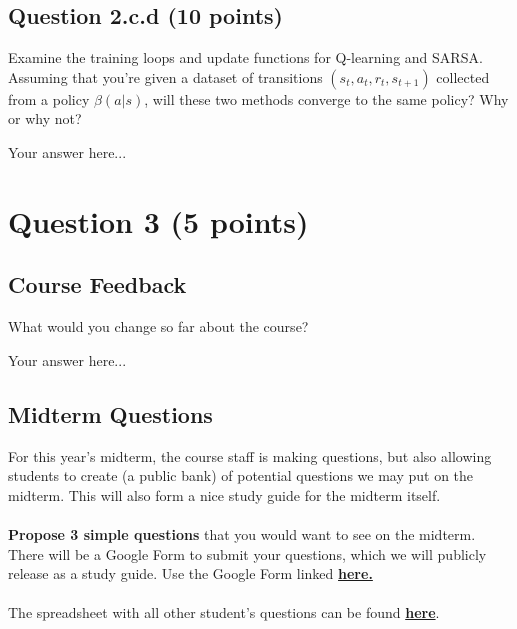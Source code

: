\documentclass[12pt]{article}
\begin{document}
\subsection*{Question 2.c.d (10 points)}
Examine the training loops and update functions for Q-learning and SARSA. Assuming that you're given a dataset of transitions $(s_t, a_t, r_t, s_{t+1})$ collected from a policy $\beta(a \vert s)$, will these two methods converge to the same policy? Why or why not?
\begin{solution}
Your answer here...
\end{solution}

\section*{Question 3 (5 points)}
\subsection*{Course Feedback}
What would you change so far about the course?

\begin{solution}
Your answer here...
\end{solution}

\subsection*{Midterm Questions}
For this year's midterm, the course staff is making questions, but also allowing students to create (a public bank) of potential questions we may put on the midterm. This will also form a nice study guide for the midterm itself.
\\\\
\textbf{Propose 3 simple questions} that you would want to see on the midterm. There will be a Google Form to submit your questions, which we will publicly release as a study guide. Use the Google Form linked \textbf{ \href{https://docs.google.com/forms/d/e/1FAIpQLSf_R6BmyPmL2xqTLhjCuGk3VhnWLVolgRAcbJcYZ4JZIrur6w/viewform?usp=header}{here.}}
\\\\
The spreadsheet with all other student's questions can be found \href{https://docs.google.com/spreadsheets/d/1NNUCzxik1hsLzYCcXDZvyr-dMafs1CGRMQtLl6lOYWQ/edit?usp=sharing}{\textbf{here}}.
\end{document}
